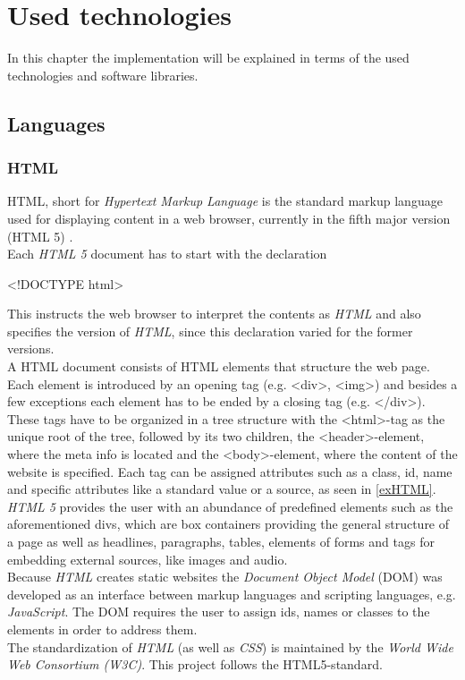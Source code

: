 
\chapter{Used technologies}
  \label{technologies}

In this chapter the implementation will be explained in terms of the used technologies and software libraries.
\section{Languages}
\subsection{HTML}
HTML, short for \textit{Hypertext Markup Language} is the standard markup language used for displaying content in a web browser, currently in the fifth major version (HTML 5) \cite{hogan_2011,w3c,wiki-html}.\\
Each \textit{HTML 5} document has to start with the declaration 
\begin{center}
\textless !DOCTYPE html\textgreater
\end{center}
This instructs the web browser to interpret the contents as \textit{HTML} and also specifies the version of \textit{HTML}, since this declaration varied for the former versions.\\
A HTML document consists of HTML elements that structure the web page. Each element is introduced by an opening tag (e.g. \textless div\textgreater, \textless img\textgreater) and besides a few exceptions each element has to be ended by a closing tag (e.g. \textless /div\textgreater). These tags have to be organized in a tree structure with the \textless html\textgreater-tag as the unique root of the tree, followed by its two children, the \textless header\textgreater-element, where the meta info is located and the \textless body\textgreater-element, where the content of the website is specified. Each tag can be assigned attributes such as a class, id, name and specific attributes like a standard value or a source, as seen in \autoref{exHTML}.\\
\textit{HTML 5} provides the user with an abundance of predefined elements such as the aforementioned divs, which are box containers providing the general structure of a page as well as headlines, paragraphs, tables, elements of forms and tags for embedding external sources, like images and audio.\\
Because \textit{HTML} creates static websites the \textit{Document Object Model} (DOM) was developed as an interface between markup languages and scripting languages, e.g. \textit{JavaScript}. The DOM requires the user to assign ids, names or classes to the elements in order to address them. \\
The standardization of \textit{HTML} (as well as \textit{CSS}) is maintained by the \textit{World Wide Web Consortium (W3C)}. This project follows the HTML5-standard.

